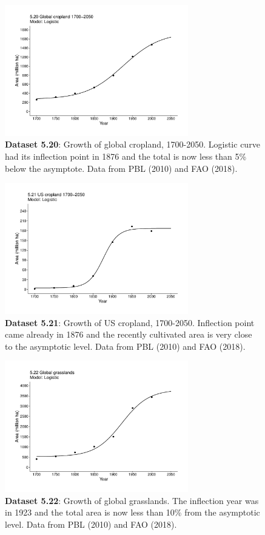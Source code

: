 \documentclass[aps,rmp,preprint,superscriptaddress,10pt,onecolumn]{article}
\begin{document}
\begin{figure}[h]
\includegraphics[width=8cm]{output/figs-ggplot/5.20.pdf}
\caption{\textbf{Dataset 5.20}: Growth of global cropland, 1700-2050. Logistic curve had its inflection point in 1876 and the total is now less than 5\% below the asymptote. Data from PBL (2010) and FAO (2018).}
\end{figure}
	
\begin{figure}[h]
\includegraphics[width=8cm]{output/figs-ggplot/5.21.pdf}
\caption{\textbf{Dataset 5.21}: Growth of US cropland, 1700-2050. Inflection point came already in 1876 and the recently cultivated area is very close to the asymptotic level. Data from PBL (2010) and FAO (2018).}
\end{figure}
	
\begin{figure}[h]
\includegraphics[width=8cm]{output/figs-ggplot/5.22.pdf}
\caption{\textbf{Dataset 5.22}: Growth of global grasslands. The inflection year was in 1923 and the total area is now less than 10\% from the asymptotic level. Data from PBL (2010) and FAO (2018).}
\end{figure}
	
\end{document}
